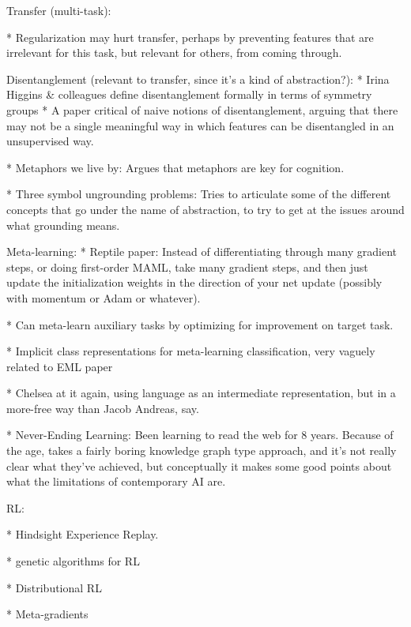 Transfer (multi-task):

* Regularization may hurt transfer, perhaps by preventing features that are irrelevant for this task, but relevant for others, from coming through. \citep{Kornblith2019} 

    Disentanglement (relevant to transfer, since it's a kind of abstraction?):
        * Irina Higgins & colleagues define disentanglement formally in terms of symmetry groups \citep{Higgins2018}
        * A paper critical of naive notions of disentanglement, arguing that there may not be a single meaningful way in which features can be disentangled in an unsupervised way. \citep{Locatello2019}

* Metaphors we live by: Argues that metaphors are key for cognition. \citep{Lakoff2008} 

* Three symbol ungrounding problems: Tries to articulate some of the different concepts that go under the name of abstraction, to try to get at the issues around what grounding means. \citep{Dove2006}

Meta-learning:
* Reptile paper: Instead of differentiating through many gradient steps, or doing first-order MAML, take many gradient steps, and then just update the initialization weights in the direction of your net update (possibly with momentum or Adam or whatever). \citep{Nichol2018} 

* Can meta-learn auxiliary tasks by optimizing for improvement on target task. \citep{Liu2019a}

* Implicit class representations for meta-learning classification, very vaguely related to EML paper \citep{Ravichandran2019}

* Chelsea at it again, using language as an intermediate representation, but in a more-free way than Jacob Andreas, say. \citep{Jiang2019}

* Never-Ending Learning: Been learning to read the web for 8 years. Because of the age, takes a fairly boring knowledge graph type approach, and it's not really clear what they've achieved, but conceptually it makes some good points about what the limitations of contemporary AI are. \citep{Mitchell2018}

RL:

* Hindsight Experience Replay. \citep{Andrychowicz2017}

* genetic algorithms for RL \citep{Petroski2018}

* Distributional RL \citep{Bellemare2017}

* Meta-gradients \citep{Xu2018a}

